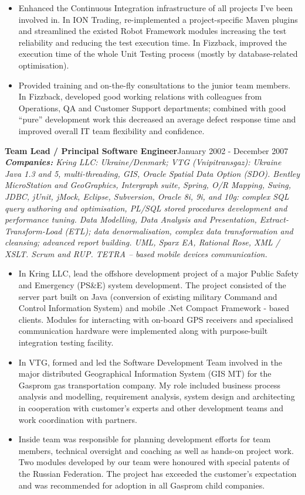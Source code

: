\documentclass{res}
\newcommand{\aggjobdes}[4]{\needspace{3\baselineskip} %
{\noindent \bf #1\hspace{2ex}}{\hfill #2}\\
{{\noindent \small \textit{ \textbf{ Companies:} {\hfill #3}}}}\\{{\it \small #4.}}}
\begin{document}
\begin{resume}
\begin{itemize}
 \item Enhanced the Continuous Integration infrastructure of all projects I've been involved in. In ION Trading, re-implemented a project-specific Maven plugins and streamlined the existed Robot Framework modules increasing the test reliability and reducing the test execution time. In Fizzback, improved the execution time of the whole Unit Testing process (mostly by database-related optimisation).
 \item Provided training and on-the-fly consultations to the junior team members. In Fizzback, developed good working relations with colleagues from Operations, QA and Customer Support departments; combined with good ``pure'' development work this decreased an average defect response time and improved overall IT team flexibility and confidence.
 \end{itemize}

\aggjobdes {Team Lead / Principal Software Engineer}{January 2002 - December 2007}
{Kring LLC: Ukraine/Denmark; VTG (Vnipitransgaz): Ukraine}
{Java 1.3 and 5, multi-threading, GIS, Oracle Spatial Data Option (SDO). Bentley MicroStation and GeoGraphics, Intergraph suite, Spring, O/R Mapping, Swing, JDBC, jUnit, jMock, Eclipse, Subversion, Oracle 8i, 9i, and 10g: complex SQL query authoring and optimisation, PL/SQL stored procedures development and performance tuning. Data Modelling, Data Analysis and Presentation, Extract-Transform-Load (ETL); data denormalisation, complex data transformation and cleansing; advanced report building.  UML, Sparx EA, Rational Rose, XML / XSLT. Scrum and RUP. TETRA – based mobile devices communication}
\begin{itemize} %
 \item In Kring LLC, lead the offshore development project of a major Public Safety and Emergency (PS\&E) system development. The project consisted of the server part built on Java (conversion of existing military Command and Control Information System) and mobile .Net Compact Framework - based clients. Modules for interacting with on-board GPS receivers and specialised communication hardware were implemented along with purpose-built integration testing facility.
 \item In VTG, formed and led the Software Development Team involved in the major distributed Geographical Information System (GIS MT) for the Gasprom gas transportation company. My role included business process analysis and modelling, requirement analysis, system design and architecting in cooperation with customer’s experts and other development teams and work coordination with partners.
 \item Inside team was responsible for planning development efforts for team members, technical oversight and coaching as well as hands-on project work. Two modules developed by our team were honoured with special patents of the Russian Federation. The project has exceeded the customer’s expectation and was recommended for adoption in all Gasprom child companies.
\end{itemize}


\end{resume}
\end{document}
